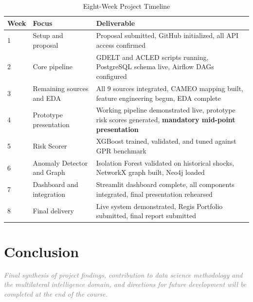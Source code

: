 \documentclass[12pt, onecolumn]{IEEEtran}
\newcommand{\placeholder}[1]{\textit{\textcolor{gray}{#1}}}
\begin{document}
\begin{table}[ht]
\caption{Eight-Week Project Timeline}
\label{tab:timeline}
\centering
\renewcommand{\arraystretch}{1.3}
\begin{tabular}{p{0.8cm} p{3.0cm} p{5.4cm}}
\toprule
\textbf{Week} & \textbf{Focus} & \textbf{Deliverable} \\
\midrule
1 & Setup and proposal &
  Proposal submitted, GitHub initialized, all API access confirmed \\
2 & Core pipeline &
  GDELT and ACLED scripts running, PostgreSQL schema live, Airflow DAGs configured \\
3 & Remaining sources and EDA &
  All 9 sources integrated, CAMEO mapping built, feature engineering begun, EDA complete \\
4 & Prototype presentation &
  Working pipeline demonstrated live, prototype risk scores generated, \textbf{mandatory mid-point presentation} \\
5 & Risk Scorer &
  XGBoost trained, validated, and tuned against GPR benchmark \\
6 & Anomaly Detector and Graph &
  Isolation Forest validated on historical shocks, NetworkX graph built, Neo4j loaded \\
7 & Dashboard and integration &
  Streamlit dashboard complete, all components integrated, final presentation rehearsed \\
8 & Final delivery &
  Live system demonstrated, Regis Portfolio submitted, final report submitted \\
\bottomrule
\end{tabular}
\end{table}


\section{Conclusion}

\placeholder{Final synthesis of project findings, contribution to data science methodology and the multilateral intelligence domain, and directions for future development will be completed at the end of the course.}




\end{document}
